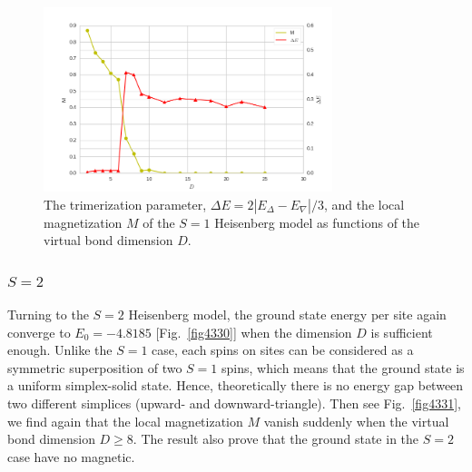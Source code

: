 \begin{figure}[!t]
	\centering
	\includegraphics[width=0.75\textwidth]{figures/3pess_MDE.png}
	\caption[The trimerization parameter, $\Delta E = 2 |E_{\Delta}-E_{\nabla}| / 3$, and the local magnetization $M$ of the $S=1$ Heisenberg model as functions of the virtual bond dimension $D$]{The trimerization parameter, $\Delta E = 2 |E_{\Delta}-E_{\nabla}| / 3$, and the local magnetization $M$ of the $S=1$ Heisenberg model as functions of the virtual bond dimension $D$.}
	\label{fig4328}
\end{figure}


\subsubsection{$S=2$}

Turning to the $S=2$ Heisenberg model, the ground state energy per site again converge to $E_0 = -4.8185$ [Fig.~\ref{fig4330}] when the dimension $D$ is sufficient enough. Unlike the $S=1$ case, each spins on sites can be considered as a symmetric superposition of two $S=1$ spins, which means that the ground state is a uniform simplex-solid state. Hence, theoretically there is no energy gap between two different simplices (upward- and downward-triangle). Then see Fig.~\ref{fig4331}, we find again that the local magnetization $M$ vanish suddenly when the virtual bond dimension $D \geq 8$. The result also prove that the ground state in the $S=2$ case have no magnetic.

